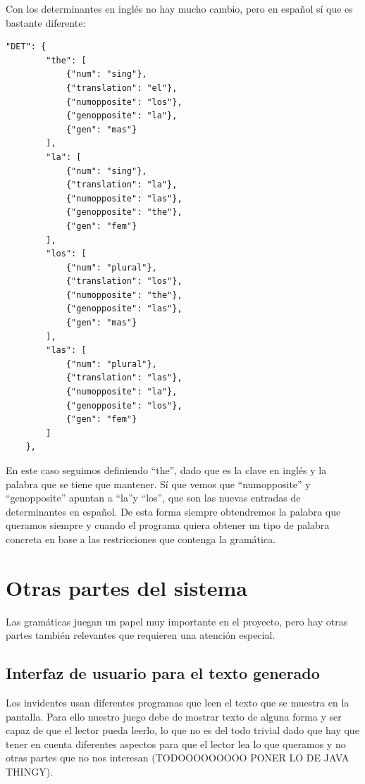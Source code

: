 Con los determinantes en inglés no hay mucho cambio, pero en español sí que es bastante diferente:

\begin{lstlisting}[style=json]
"DET": {
        "the": [
            {"num": "sing"},
            {"translation": "el"},
            {"numopposite": "los"},
            {"genopposite": "la"},
            {"gen": "mas"}
        ],
        "la": [
            {"num": "sing"},
            {"translation": "la"},
            {"numopposite": "las"},
            {"genopposite": "the"},
            {"gen": "fem"}
        ],
        "los": [
            {"num": "plural"},
            {"translation": "los"},
            {"numopposite": "the"},
            {"genopposite": "las"},
            {"gen": "mas"}
        ],
        "las": [
            {"num": "plural"},
            {"translation": "las"},
            {"numopposite": "la"},
            {"genopposite": "los"},
            {"gen": "fem"}
        ]
    },
\end{lstlisting}

En este caso seguimos definiendo ``the'', dado que es la clave en inglés y la palabra que se tiene que mantener. Sí que vemos que ``numopposite'' y ``genopposite'' apuntan a ``la''y ``los'', que son las nuevas entradas de determinantes en español. De esta forma siempre obtendremos la palabra que queramos siempre y cuando el programa quiera obtener un tipo de palabra concreta en base a las restricciones que contenga la gramática.

\section{Otras partes del sistema}

Las gramáticas juegan un papel muy importante en el proyecto, pero hay otras partes también relevantes que requieren una atención especial.

\subsection{Interfaz de usuario para el texto generado}

Los invidentes usan diferentes programas que leen el texto que se muestra en la pantalla. Para ello nuestro juego debe de mostrar texto de alguna forma y ser capaz de que el lector pueda leerlo, lo que no es del todo trivial dado que hay que tener en cuenta diferentes aspectos para que el lector lea lo que queramos y no otras partes que no nos interesan (TODOOOOOOOOO PONER LO DE JAVA THINGY).

